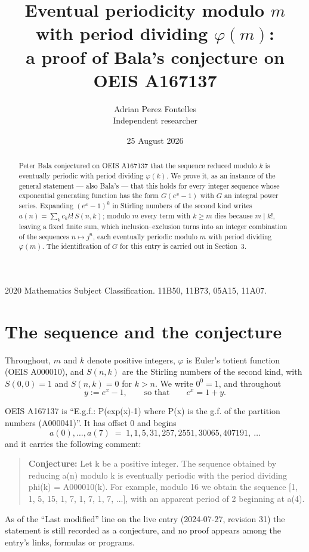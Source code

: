 \documentclass[11pt,a4paper]{article}
\title{Eventual periodicity modulo $m$ with period dividing $\varphi(m)$:\\a proof of Bala's conjecture on OEIS A167137}
\author{Adrian Perez Fontelles\\ \small Independent researcher}
\date{25 August 2026}
\theoremstyle{plain}
\theoremstyle{definition}
\begin{document}
\maketitle

\begin{abstract}
Peter Bala conjectured on OEIS A167137 that the sequence reduced modulo $k$ is eventually periodic with period dividing $\varphi(k)$. We prove it, as an instance of the general statement --- also Bala's --- that this holds for every integer sequence whose exponential generating function has the form $G(e^{x}-1)$ with $G$ an integral power series. Expanding $(e^{x}-1)^{k}$ in Stirling numbers of the second kind writes $a(n)=\sum_{k}c_{k}k!\,S(n,k)$; modulo $m$ every term with $k\ge m$ dies because $m\mid k!$, leaving a fixed finite sum, which inclusion--exclusion turns into an integer combination of the sequences $n\mapsto j^{n}$, each eventually periodic modulo $m$ with period dividing $\varphi(m)$. The identification of $G$ for this entry is carried out in Section~3.
\end{abstract}

\noindent\small 2020 Mathematics Subject Classification. 11B50, 11B73, 05A15, 11A07.\normalsize

\section{The sequence and the conjecture}

Throughout, $m$ and $k$ denote positive integers, $\varphi$ is Euler's totient function
(OEIS A000010), and $S(n,k)$ are the Stirling numbers of the second kind, with
$S(0,0)=1$ and $S(n,k)=0$ for $k>n$. We write $0^{0}=1$, and throughout
\[
y := e^{x}-1, \qquad\text{so that}\qquad e^{x}=1+y .
\]

OEIS A167137 is ``E.g.f.: P(exp(x)-1) where P(x) is the g.f. of the partition numbers (A000041)''. It has offset $0$ and begins
\[
a(0),\dots,a(7)\;=\;1, 1, 5, 31, 257, 2551, 30065, 407191,\ \dots
\]
and it carries the following comment:
\begin{quote}\small
\textbf{Conjecture:} Let k be a positive integer. The sequence obtained by reducing a(n) modulo k is eventually periodic with the period dividing phi(k) = A000010(k). For example, modulo 16 we obtain the sequence [1, 1, 5, 15, 1, 7, 1, 7, 1, 7, ...], with an apparent period of 2 beginning at a(4).
\end{quote}
As of the ``Last modified'' line on the live entry (2024-07-27, revision 31) the
statement is still recorded as a conjecture, and no proof appears among the entry's links,
formulas or programs.
\end{document}
